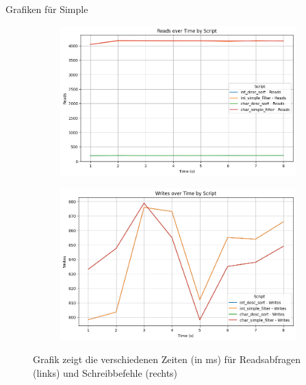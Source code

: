 Grafiken für Simple
\begin{figure}[!ht]
    \centering
    \begin{subfigure}[t]{0.48\textwidth}
        \centering
        \includegraphics[width=\textwidth]{PNGs/Data_Types/Simpler/Reads}
        \label{data-types-simpler-reads}
    \end{subfigure}
    \hfill
    \begin{subfigure}[t]{0.48\textwidth}
        \centering
        \includegraphics[width=\textwidth]{PNGs/Data_Types/Simpler/Writes}
        \label{data-types-simpler-writes}
    \end{subfigure}
    \caption[Data-Types-Simpler: Reads und Writes]{Grafik zeigt die verschiedenen Zeiten (in ms) für Readsabfragen (links) und Schreibbefehle (rechts)}
    \label{fig:data-types-simpler-measures}
\end{figure}

